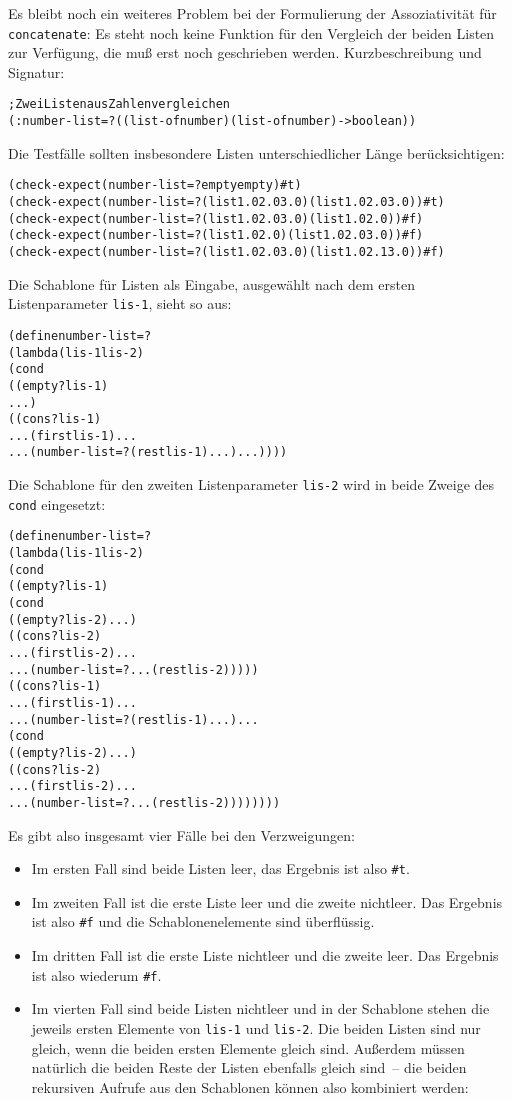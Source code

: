 Es bleibt noch ein weiteres Problem bei der Formulierung der
Assoziativität für \texttt{concatenate}: Es steht noch keine Funktion
für den Vergleich der beiden Listen zur Verfügung, die muß erst noch
geschrieben werden.  Kurzbeschreibung und Signatur:
%
\begin{alltt}
; Zwei Listen aus Zahlen vergleichen
(: number-list=? ((list-of number) (list-of number) -> boolean))
\end{alltt}
%
Die Testfälle sollten insbesondere Listen unterschiedlicher Länge
berücksichtigen:
%
\begin{alltt}
(check-expect (number-list=? empty empty) #t)
(check-expect (number-list=? (list 1.0 2.0 3.0) (list 1.0 2.0 3.0)) #t)
(check-expect (number-list=? (list 1.0 2.0 3.0) (list 1.0 2.0)) #f)
(check-expect (number-list=? (list 1.0 2.0) (list 1.0 2.0 3.0)) #f)
(check-expect (number-list=? (list 1.0 2.0 3.0) (list 1.0 2.1 3.0)) #f)
\end{alltt}
%
Die Schablone für Listen als Eingabe, ausgewählt nach dem ersten Listenparameter
\texttt{lis-1}, sieht so aus:
% 
\begin{alltt}
(define number-list=?
  (lambda (lis-1 lis-2)
    (cond
      ((empty? lis-1)
       ...)
      ((cons? lis-1)
       ... (first lis-1) ...
       ... (number-list=? (rest lis-1) ...) ...))))
\end{alltt}
%
Die Schablone für den zweiten Listenparameter \texttt{lis-2} wird in
beide Zweige des \texttt{cond} eingesetzt:
%
\begin{alltt}
(define number-list=?
  (lambda (lis-1 lis-2)
    (cond
      ((empty? lis-1)
       (cond
         ((empty? lis-2) ...)
         ((cons? lis-2)
          ... (first lis-2) ...
          ... (number-list=? ... (rest lis-2)))))
      ((cons? lis-1)
       ... (first lis-1) ...
       ... (number-list=? (rest lis-1) ...) ...
       (cond
         ((empty? lis-2) ...)
         ((cons? lis-2)
          ... (first lis-2) ...
          ... (number-list=? ... (rest lis-2))))))))
\end{alltt}
%
Es gibt also insgesamt vier Fälle bei den Verzweigungen:
\begin{itemize}
\item Im ersten
Fall sind beide Listen leer, das Ergebnis ist also \texttt{\#t}.
\item Im zweiten Fall ist die erste Liste leer und die zweite
  nichtleer.  Das Ergebnis ist also \texttt{\#f} und die
  Schablonenelemente sind überflüssig.
\item Im dritten Fall ist die erste Liste nichtleer und die zweite
  leer.  Das Ergebnis ist also wiederum \texttt{\#f}.
\item Im vierten Fall sind beide Listen nichtleer und in der Schablone
  stehen die jeweils ersten Elemente von \texttt{lis-1} und
  \texttt{lis-2}.  Die beiden Listen sind nur gleich, wenn die beiden
  ersten Elemente gleich sind.  Außerdem müssen natürlich die beiden
  Reste der Listen ebenfalls gleich sind~-- die beiden rekursiven
  Aufrufe aus den Schablonen können also kombiniert werden:
\end{itemize}
